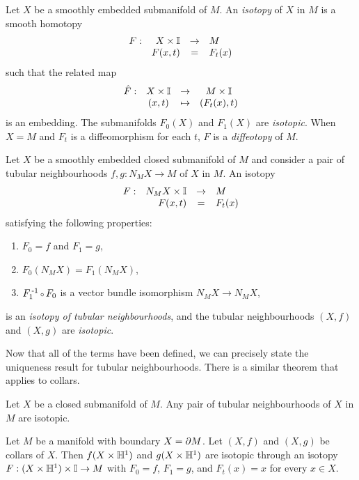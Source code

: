 \begin{defn}[Isotopy]
	\label{def:isotopy}
	Let $X$ be a smoothly embedded submanifold of $M$.
	An \emph{isotopy} of $X$ in $M$ is a smooth homotopy
	\[
		\begin{array}{crcl}
			F: & X\times \mathbb{I} & \to & M \\
			   & F(x,t) & = & F_t(x)
		\end{array}
	\]
	such that the related map
	\[
		\begin{array}{cccc}
			\hat{F}: & X\times\mathbb{I} & \to & M\times\mathbb{I} \\
					 & (x,t) & \mapsto & (F_t(x),t)
		\end{array}
	\]
	is an embedding.
	The submanifolds $F_0(X)$ and $F_1(X)$ are \emph{isotopic}.
	When $X=M$ and $F_t$ is a diffeomorphism for each $t$, $F$ is a \emph{diffeotopy} of $M$.
	
	Let $X$ be a smoothly embedded closed submanifold of $M$ and consider a pair of tubular neighbourhoods $f,g:N_M X\to M$ of $X$ in $M$.
	An isotopy
	\[
		\begin{array}{crcl}
			F: & N_M X\times\mathbb{I} & \to & M \\
			   & F(x,t) & = & F_t(x)
		\end{array}
	\]
	satisfying the following properties:
	\begin{enumerate}
		\item $F_0=f$ and $F_1=g$,
		\item $F_0(N_M X)=F_1(N_M X)$,
		\item $F_1\inv\comp F_0$ is a vector bundle isomorphism $N_M X\to N_M X$,
	\end{enumerate}
	 is an \emph{isotopy of tubular neighbourhoods}, and the tubular neighbourhoods $(X,f)$ and $(X,g)$ are \emph{isotopic}.
\end{defn}

Now that all of the terms have been defined, we can precisely state the uniqueness result for tubular neighbourhoods.
There is a similar theorem that applies to collars.

\begin{theorem}
	\label{prop:uniquenesstubularneighbourhood}
	Let $X$ be a closed submanifold of $M$.
	Any pair of tubular neighbourhoods of $X$ in $M$ are isotopic.
\end{theorem}

\begin{theorem}
	Let $M$ be a manifold with boundary $X = \partial M$.
	Let $(X,f)$ and $(X,g)$ be collars of $X$.
	Then $f(X\times\mathbb{H}^1)$ and $g(X\times\mathbb{H}^1)$ are isotopic through an isotopy $F:(X\times\mathbb{H}^1)\times\mathbb{I}\to M$ with $F_0=f$, $F_1=g$, and $F_t(x)=x$ for every $x\in X$.	
\end{theorem}

